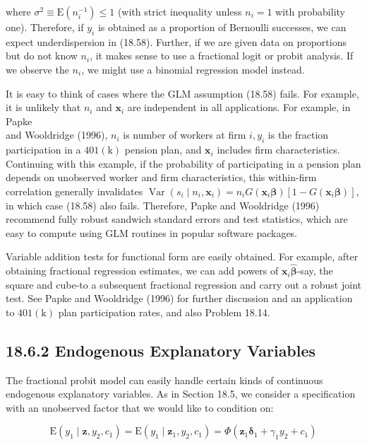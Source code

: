 \documentclass[10pt]{article}
\begin{document}
where $\sigma^{2} \equiv \mathrm{E}\left(n_{i}^{-1}\right) \leq 1$ (with strict inequality unless $n_{i}=1$ with probability one). Therefore, if $y_{i}$ is obtained as a proportion of Bernoulli successes, we can expect underdispersion in (18.58). Further, if we are given data on proportions but do not know $n_{i}$, it makes sense to use a fractional logit or probit analysis. If we observe the $n_{i}$, we might use a binomial regression model instead.

It is easy to think of cases where the GLM assumption (18.58) fails. For example, it is unlikely that $n_{i}$ and $\mathbf{x}_{i}$ are independent in all applications. For example, in Papke\\
and Wooldridge (1996), $n_{i}$ is number of workers at firm $i, y_{i}$ is the fraction participation in a $401(\mathrm{k})$ pension plan, and $\mathbf{x}_{i}$ includes firm characteristics. Continuing with this example, if the probability of participating in a pension plan depends on unobserved worker and firm characteristics, this within-firm correlation generally invalidates $\operatorname{Var}\left(s_{i} \mid n_{i}, \mathbf{x}_{i}\right)=n_{i} G\left(\mathbf{x}_{i} \boldsymbol{\beta}\right)\left[1-G\left(\mathbf{x}_{i} \boldsymbol{\beta}\right)\right]$, in which case (18.58) also fails. Therefore, Papke and Wooldridge (1996) recommend fully robust sandwich standard errors and test statistics, which are easy to compute using GLM routines in popular software packages.

Variable addition tests for functional form are easily obtained. For example, after obtaining fractional regression estimates, we can add powers of $\mathbf{x}_{i} \hat{\boldsymbol{\beta}}$-say, the square and cube-to a subsequent fractional regression and carry out a robust joint test. See Papke and Wooldridge (1996) for further discussion and an application to $401(\mathrm{k})$ plan participation rates, and also Problem 18.14.

\subsection*{18.6.2 Endogenous Explanatory Variables}
The fractional probit model can easily handle certain kinds of continuous endogenous explanatory variables. As in Section 18.5, we consider a specification with an unobserved factor that we would like to condition on:


\begin{equation*}
\mathrm{E}\left(y_{1} \mid \mathbf{z}, y_{2}, c_{1}\right)=\mathrm{E}\left(y_{1} \mid \mathbf{z}_{1}, y_{2}, c_{1}\right)=\Phi\left(\mathbf{z}_{1} \boldsymbol{\delta}_{1}+\gamma_{1} y_{2}+c_{1}\right) \tag{18.61}
\end{equation*}
\end{document}
